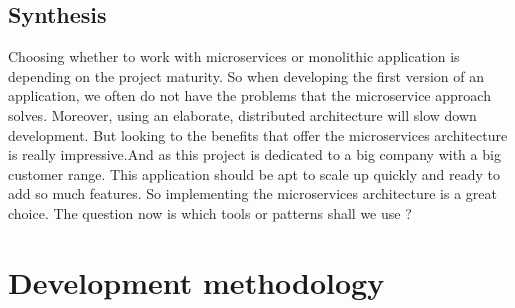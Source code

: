 \subsection{Synthesis}
\label{subsec:subsec01}
Choosing whether to work with microservices or monolithic application is depending on the project maturity. So when developing the first
 version of an application, we often do not have the problems that the microservice approach solves. 
 Moreover, using an elaborate, distributed architecture will slow down development. But looking to the benefits that offer the microservices architecture is
 really impressive.And as this project is dedicated to a big company with a big customer range. This application should be apt to scale up quickly and
 ready to add so much features. So implementing the microservices architecture is a great choice.
 The question now is which tools or patterns shall we use ?	



\section{Development methodology}
\label{subsec:subsec01}

